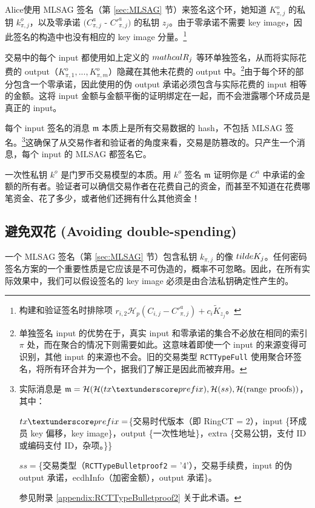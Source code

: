 {Alice使用 MLSAG 签名（第 \ref{sec:MLSAG} 节）来签名这个环，她知道 $K^o_{\pi,j}$ 的私钥 $k^o_{\pi,j}$，以及零承诺 $(C^a_{\pi,j}$ - $C'^a_{\pi,j})$ 的私钥 $z_j$。由于零承诺不需要 key image，因此签名的构造中也没有相应的 key image 分量。\footnote{构建和验证签名时排除项 $r_{i,2} \mathcal{H}_p(C_{i, j} - C'^a_{\pi, j}) + c_i \tilde{K}_{z_j}$。}

交易中的每个 input 都使用如上定义的 \(\\mathcal{R}_j\) 等环单独签名，从而将实际花费的 output（$K^o_{\pi,1},...,K^o_{\pi,m}$）隐藏在其他未花费的 output 中。\footnote{单独签名 input 的优势在于，真实 input 和零承诺的集合不必放在相同的索引 $\pi$ 处，而在聚合的情况下则需要如此。这意味着即使一个 input 的来源变得可识别，其他 input 的来源也不会。旧的交易类型 {\tt RCTTypeFull} 使用聚合环签名，将所有环合并为一个，据我们了解正是因此而被弃用。}由于每个环的部分包含一个零承诺，因此使用的伪 output 承诺必须包含与实际花费的 input 相等的金额。这将 input 金额与金额平衡的证明绑定在一起，而不会泄露哪个环成员是真正的 input。

每个 input 签名的消息 $\mathfrak{m}$ 本质上是所有交易数据的 hash，{不包括} MLSAG 签名。\footnote{实际消息是 $\mathfrak{m} = \mathcal{H}(\mathcal{H}(tx\textunderscore prefix),\mathcal{H}(ss),\mathcal{H}(\text{range proofs}))$，其中：\par
$tx\textunderscore prefix = $\{交易时代版本（即 RingCT = 2），input \{环成员 key 偏移，key image\}，output \{一次性地址\}，extra \{交易公钥，支付 ID 或编码支付 ID，杂项。\}\}\par
$ss = $\{交易类型（{\tt RCTTypeBulletproof2} = '4'），交易手续费，input 的伪 output 承诺，ecdhInfo（加密金额），output 承诺\}。\par
参见附录 \ref{appendix:RCTTypeBulletproof2} 关于此术语。}这确保了从交易作者和验证者的角度来看，交易是防篡改的。只产生一个消息，每个 input 的 MLSAG 都签名它。

一次性私钥 $k^o$ 是门罗币交易模型的本质。用 $k^o$ 签名 $\mathfrak{m}$ 证明你是 $C^a$ 中承诺的金额的所有者。验证者可以确信交易作者在花费自己的资金，而甚至不知道在花费哪笔资金、花了多少，或者他们还拥有什么其他资金！


\subsection{避免双花 (Avoiding double-spending)}

一个 MLSAG 签名（第 \ref{sec:MLSAG} 节）包含私钥 \(k_{\pi, j}\) 的像 \(\\tilde{K}_{j}\)。任何密码签名方案的一个重要性质是它应该是不可伪造的，概率不可忽略。因此，在所有实际效果中，我们可以假设签名的 key image 必须是由合法私钥确定性产生的。

}
